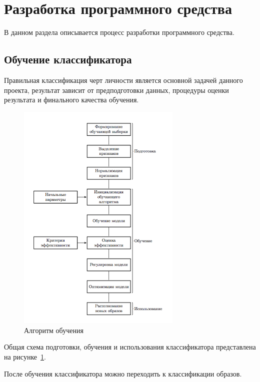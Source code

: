 \section{Разработка программного средства}
В данном раздела описывается процесс разработки программного \mbox{средства.}

\subsection{Обучение классификатора}
Правильная классификация черт личности является основной задачей данного проекта, результат зависит от предподготовки данных, процедуры оценки результата и финального качества обучения.

\begin{figure}[h]
    \centering
    \includegraphics[width=0.7\textwidth]{figures/SVM_flow.png}
    \caption{Алгоритм обучения}
    \label{fig:develoipment:svm_flow}
\end{figure}

Общая схема подготовки, обучения и использования классификатора представлена на рисунке~\ref{fig:develoipment:svm_flow}.

После обучения классификатора можно переходить к классификации образов. 

